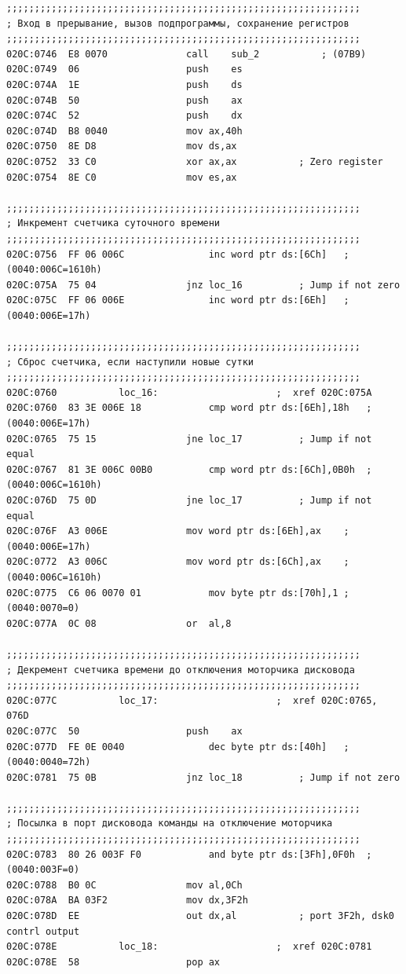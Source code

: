 ﻿\documentclass[a4paper,12pt]{article}
\begin{document}
\begin{lstlisting}
;;;;;;;;;;;;;;;;;;;;;;;;;;;;;;;;;;;;;;;;;;;;;;;;;;;;;;;;;;;;;;;
; Вход в прерывание, вызов подпрограммы, сохранение регистров
;;;;;;;;;;;;;;;;;;;;;;;;;;;;;;;;;;;;;;;;;;;;;;;;;;;;;;;;;;;;;;;
020C:0746  E8 0070				call	sub_2			; (07B9)
020C:0749  06					push	es
020C:074A  1E					push	ds
020C:074B  50					push	ax
020C:074C  52					push	dx
020C:074D  B8 0040				mov	ax,40h
020C:0750  8E D8				mov	ds,ax
020C:0752  33 C0				xor	ax,ax			; Zero register
020C:0754  8E C0				mov	es,ax

;;;;;;;;;;;;;;;;;;;;;;;;;;;;;;;;;;;;;;;;;;;;;;;;;;;;;;;;;;;;;;;
; Инкремент счетчика суточного времени
;;;;;;;;;;;;;;;;;;;;;;;;;;;;;;;;;;;;;;;;;;;;;;;;;;;;;;;;;;;;;;;
020C:0756  FF 06 006C				inc	word ptr ds:[6Ch]	; (0040:006C=1610h)
020C:075A  75 04				jnz	loc_16			; Jump if not zero
020C:075C  FF 06 006E				inc	word ptr ds:[6Eh]	; (0040:006E=17h)

;;;;;;;;;;;;;;;;;;;;;;;;;;;;;;;;;;;;;;;;;;;;;;;;;;;;;;;;;;;;;;;
; Сброс счетчика, если наступили новые сутки
;;;;;;;;;;;;;;;;;;;;;;;;;;;;;;;;;;;;;;;;;;;;;;;;;;;;;;;;;;;;;;;
020C:0760			loc_16:						;  xref 020C:075A
020C:0760  83 3E 006E 18			cmp	word ptr ds:[6Eh],18h	; (0040:006E=17h)
020C:0765  75 15				jne	loc_17			; Jump if not equal
020C:0767  81 3E 006C 00B0			cmp	word ptr ds:[6Ch],0B0h	; (0040:006C=1610h)
020C:076D  75 0D				jne	loc_17			; Jump if not equal
020C:076F  A3 006E				mov	word ptr ds:[6Eh],ax	; (0040:006E=17h)
020C:0772  A3 006C				mov	word ptr ds:[6Ch],ax	; (0040:006C=1610h)
020C:0775  C6 06 0070 01			mov	byte ptr ds:[70h],1	; (0040:0070=0)
020C:077A  0C 08				or	al,8

;;;;;;;;;;;;;;;;;;;;;;;;;;;;;;;;;;;;;;;;;;;;;;;;;;;;;;;;;;;;;;;
; Декремент счетчика времени до отключения моторчика дисковода
;;;;;;;;;;;;;;;;;;;;;;;;;;;;;;;;;;;;;;;;;;;;;;;;;;;;;;;;;;;;;;;
020C:077C			loc_17:						;  xref 020C:0765, 076D
020C:077C  50					push	ax
020C:077D  FE 0E 0040				dec	byte ptr ds:[40h]	; (0040:0040=72h)
020C:0781  75 0B				jnz	loc_18			; Jump if not zero

;;;;;;;;;;;;;;;;;;;;;;;;;;;;;;;;;;;;;;;;;;;;;;;;;;;;;;;;;;;;;;;
; Посылка в порт дисковода команды на отключение моторчика
;;;;;;;;;;;;;;;;;;;;;;;;;;;;;;;;;;;;;;;;;;;;;;;;;;;;;;;;;;;;;;;
020C:0783  80 26 003F F0			and	byte ptr ds:[3Fh],0F0h	; (0040:003F=0)
020C:0788  B0 0C				mov	al,0Ch
020C:078A  BA 03F2				mov	dx,3F2h
020C:078D  EE					out	dx,al			; port 3F2h, dsk0 contrl output
020C:078E			loc_18:						;  xref 020C:0781
020C:078E  58					pop	ax


\end{lstlisting}
\end{document}
